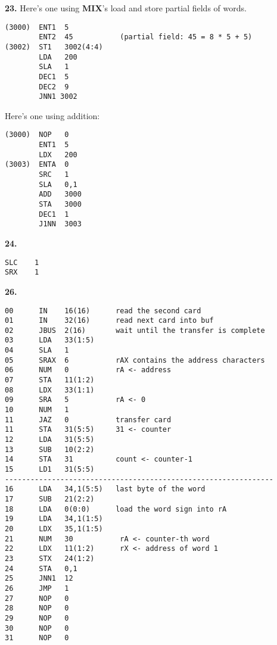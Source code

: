 \documentclass[a4paper,12pt]{article}
\newcommand{\newpar}[1]{\bigskip \noindent \textbf{#1.}}
\begin{document}
\newpar{23}
Here's one using \textbf{MIX}'s load and store partial fields of
words.
\begin{verbatim}
(3000)  ENT1  5
        ENT2  45           (partial field: 45 = 8 * 5 + 5)
(3002)  ST1   3002(4:4)
        LDA   200
        SLA   1
        DEC1  5
        DEC2  9
        JNN1 3002
\end{verbatim}
Here's one using addition:
\begin{verbatim}
(3000)  NOP   0
        ENT1  5
        LDX   200
(3003)  ENTA  0
        SRC   1
        SLA   0,1
        ADD   3000
        STA   3000
        DEC1  1
        J1NN  3003
\end{verbatim}

\newpar{24}
\begin{verbatim}
SLC    1
SRX    1
\end{verbatim}

\newpar{26}
\begin{verbatim}
00      IN    16(16)      read the second card
01      IN    32(16)      read next card into buf
02      JBUS  2(16)       wait until the transfer is complete
03      LDA   33(1:5)
04      SLA   1
05      SRAX  6           rAX contains the address characters
06      NUM   0           rA <- address
07      STA   11(1:2)
08      LDX   33(1:1)     
09      SRA   5           rA <- 0
10      NUM   1
11      JAZ   0           transfer card
11      STA   31(5:5)     31 <- counter
12      LDA   31(5:5)
13      SUB   10(2:2)
14      STA   31          count <- counter-1
15      LD1   31(5:5)
---------------------------------------------------------------
16      LDA   34,1(5:5)   last byte of the word
17      SUB   21(2:2)
18      LDA   0(0:0)      load the word sign into rA
19      LDA   34,1(1:5)
20      LDX   35,1(1:5)       
21      NUM   30           rA <- counter-th word
22      LDX   11(1:2)      rX <- address of word 1
23      STX   24(1:2)
24      STA   0,1
25      JNN1  12
26      JMP   1
27      NOP   0
28      NOP   0
29      NOP   0
30      NOP   0
31      NOP   0
\end{verbatim}
\end{document}
